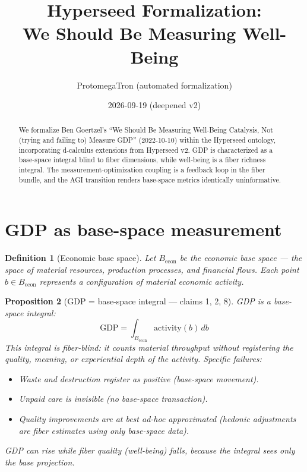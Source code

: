 \documentclass[11pt,a4paper]{article}
\title{Hyperseed Formalization:\\
  We Should Be Measuring Well-Being}
\author{ProtomegaTron (automated formalization)}
\date{2026-09-19 (deepened v2)}
\newtheorem{definition}{Definition}[section]
\newtheorem{proposition}[definition]{Proposition}
\begin{document}
\maketitle

\begin{abstract}
We formalize Ben Goertzel's ``We Should Be Measuring Well-Being Catalysis,
Not (trying and failing to) Measure GDP'' (2022-10-10) within the Hyperseed
ontology, incorporating d-calculus extensions from Hyperseed v2. GDP is
characterized as a base-space integral blind to fiber dimensions, while
well-being is a fiber richness integral. The measurement-optimization
coupling is a feedback loop in the fiber bundle, and the AGI transition
renders base-space metrics identically uninformative.
\end{abstract}

\tableofcontents

\section{GDP as base-space measurement}

\begin{definition}[Economic base space]
Let $B_{\text{econ}}$ be the \emph{economic base space} --- the space of
material resources, production processes, and financial flows. Each point
$b \in B_{\text{econ}}$ represents a configuration of material economic
activity.
\end{definition}

\begin{proposition}[GDP = base-space integral --- claims 1, 2, 8]
\label{prop:gdp}
GDP is a base-space integral:
\[
  \text{GDP} = \int_{B_{\text{econ}}} \text{activity}(b) \, db
\]
This integral is \emph{fiber-blind}: it counts material throughput without
registering the quality, meaning, or experiential depth of the activity.
Specific failures:
\begin{itemize}
  \item Waste and destruction register as positive (base-space movement).
  \item Unpaid care is invisible (no base-space transaction).
  \item Quality improvements are at best ad-hoc approximated (hedonic
    adjustments are fiber estimates using only base-space data).
\end{itemize}
GDP can rise while fiber quality (well-being) falls, because the integral
sees only the base projection.
\end{proposition}
\end{document}

